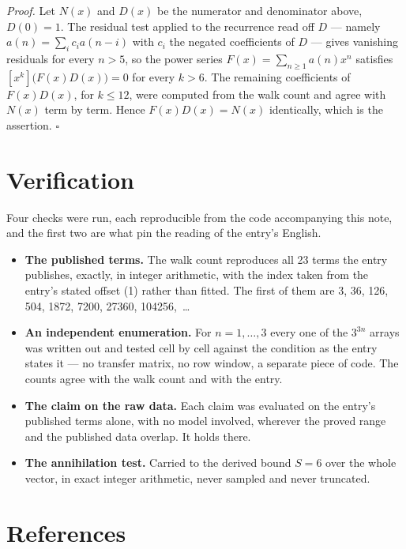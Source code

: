 \documentclass[11pt]{article}
\theoremstyle{definition}
\begin{document}
{\itshape Proof.} Let $N(x)$ and $D(x)$ be the numerator and denominator above, $D(0)=1$. The residual test applied to the recurrence read off $D$ --- namely $a(n) = \sum_i c_i a(n-i)$ with $c_i$ the negated coefficients of $D$ --- gives vanishing residuals for every $n > 5$, so the power series $F(x)=\sum_{n\ge 1}a(n)x^n$ satisfies $[x^k]\bigl(F(x)D(x)\bigr) = 0$ for every $k > 6$. The remaining coefficients of $F(x)D(x)$, for $k \le 12$, were computed from the walk count and agree with $N(x)$ term by term. Hence $F(x)D(x) = N(x)$ identically, which is the assertion. $\square$

\section{Verification}

Four checks were run, each reproducible from the code accompanying this note, and the first two are what pin the reading of the entry's English.

\begin{itemize}

\item {\bfseries The published terms.} The walk count reproduces all 23 terms the entry publishes, exactly, in integer arithmetic, with the index taken from the entry's stated offset (1) rather than fitted. The first of them are 3, 36, 126, 504, 1872, 7200, 27360, 104256,~\dots

\item {\bfseries An independent enumeration.} For $n = 1,\dots,3$ every one of the $3^{3n}$ arrays was written out and tested cell by cell against the condition as the entry states it --- no transfer matrix, no row window, a separate piece of code. The counts agree with the walk count and with the entry.

\item {\bfseries The claim on the raw data.} Each claim was evaluated on the entry's published terms alone, with no model involved, wherever the proved range and the published data overlap. It holds there.

\item {\bfseries The annihilation test.} Carried to the derived bound $S = 6$ over the whole vector, in exact integer arithmetic, never sampled and never truncated.

\end{itemize}

\section{References}
\end{document}

